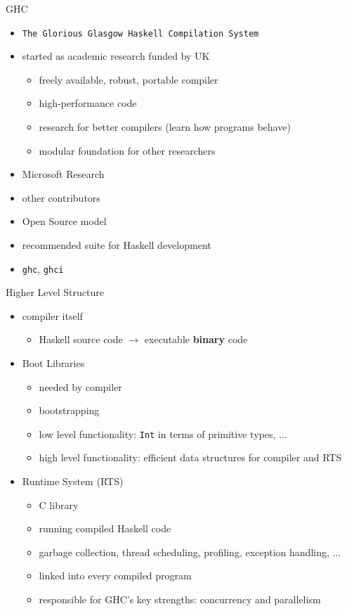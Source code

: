 \documentclass{beamer}
\begin{document}
\begin{frame}{GHC}
  \begin{itemize}
    \item \texttt{The Glorious Glasgow Haskell Compilation System}
    \pause
    \item started as academic research funded by UK
    \begin{itemize}
      \item freely available, robust, portable compiler
      \item high-performance code
      \item research for better compilers (learn how programs behave)
      \item modular foundation for other researchers
    \end{itemize}
    \pause
    \item Microsoft Research
    \item other contributors
    \item Open Source model
    \pause
    \item recommended suite for Haskell development
    \item \texttt{ghc}, \texttt{ghci}
  \end{itemize}
\end{frame}

\begin{frame}{Higher Level Structure}
  \begin{itemize}
    \item compiler itself
    \begin{itemize}
      \item Haskell source code $\rightarrow$ executable \textbf{binary} code
    \end{itemize}
    \pause
    \item Boot Libraries
    \begin{itemize}
      \item needed by compiler
      \item bootstrapping
      \item low level functionality: \texttt{Int} in terms of primitive types, $\ldots$
      \item high level functionality: efficient data structures for compiler
      and RTS
    \end{itemize}
    \pause
    \item Runtime System (RTS)
    \begin{itemize}
      \item C library
      \item running compiled Haskell code
      \item garbage collection, thread scheduling, profiling, exception
      handling, $\ldots$
      \item linked into every compiled program
      \item responsible for GHC's key strengths: concurrency and parallelism
    \end{itemize}
  \end{itemize}
\end{frame}
\end{document}
